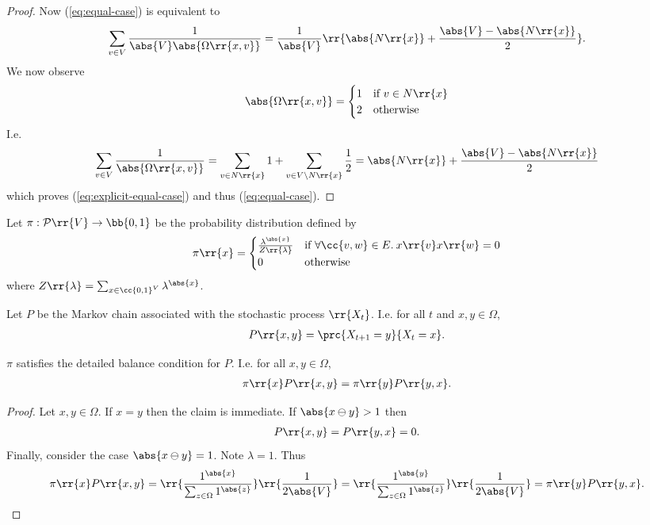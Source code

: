 \documentclass{article}
\begin{document}
\begin{claim*}[1]
\begin{proof}
    Now (\ref{eq:equal-case}) is equivalent to
    \begin{align}
      \label{eq:explicit-equal-case}
      \sum_{v\in V} \frac{1}{\abs{V}\abs{\Omega\rr{x,v}}} = \frac{1}{\abs{V}} \rr{\abs{N\rr{x}} + \frac{\abs{V}-\abs{N\rr{x}}}{2}}.
    \end{align}
    We now observe
    \begin{align*}
      \abs{\Omega\rr{x,v}} =
      \begin{cases}
        1 & \text{if } v\in N\rr{x} \\
        2 & \text{otherwise}
      \end{cases}
    \end{align*}
    I.e.
    \begin{align*}
      \sum_{v\in V} \frac{1}{\abs{\Omega\rr{x,v}}} = \sum_{v\in N\rr{x}} 1 + \sum_{v\in V\setminus N\rr{x}} \frac{1}{2} =  \abs{N\rr{x}} + \frac{\abs{V}-\abs{N\rr{x}}}{2}
    \end{align*}
    which proves (\ref{eq:explicit-equal-case}) and thus (\ref{eq:equal-case}).
  \end{proof}
\end{claim*}

Let $\pi:\mathcal P\rr{V}\to\bb{0,1}$ be the probability distribution defined by
\begin{align*}
  \pi\rr{x}=
  \begin{cases}
    \frac{\lambda^{\abs{x}}}{Z\rr{\lambda}} &\text{if }\forall \cc{v,w}\in E.\:x\rr{v}x\rr{w}=0 \\
    0 &\text{otherwise}
  \end{cases}
\end{align*}
where $Z\rr{\lambda}=\sum_{x\in\cc{0,1}^V} \lambda^{\abs{x}}$.

Let $P$ be the Markov chain associated with the stochastic process $\rr{X_t}$. I.e.
for all $t$ and $x,y\in\Omega$,
\begin{align*}
  P\rr{x,y}=\prc{X_{t+1}=y}{X_t=x}.
\end{align*}


\begin{claim*}[2]
  $\pi$ satisfies the detailed balance condition for $P$.
  I.e. for all $x,y\in\Omega$,
  \begin{align*}
    \pi\rr{x}P\rr{x,y}=\pi\rr{y}P\rr{y,x}.
  \end{align*}
  \begin{proof}
    Let $x,y\in\Omega$. 
    If $x=y$ then the claim is immediate. If $\abs{x\ominus y}>1$ then
    \begin{align*}
      P\rr{x,y}=P\rr{y,x}=0.
    \end{align*}
    Finally, consider the case $\abs{x\ominus y}=1$. Note $\lambda=1$. Thus
    \begin{align*}
      \pi\rr{x}P\rr{x,y}=\rr{\frac{1^{\abs{x}}}{\sum_{z\in\Omega} 1^{\abs{z}}}}\rr{\frac{1}{2\abs{V}}}
                        =\rr{\frac{1^{\abs{y}}}{\sum_{z\in\Omega} 1^{\abs{z}}}}\rr{\frac{1}{2\abs{V}}}
                        =\pi\rr{y}P\rr{y,x}.
    \end{align*}
  \end{proof}
\end{claim*}
\end{document}
